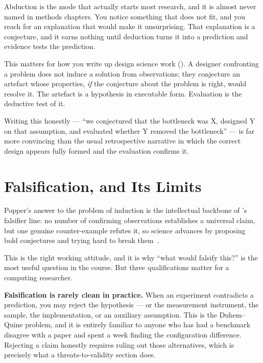 Abduction is the mode that actually starts most research, and it is almost
never named in methods chapters. You notice something that does not fit, and
you reach for an explanation that would make it unsurprising. That explanation
is a conjecture, and it earns nothing until deduction turns it into a
prediction and evidence tests the prediction.

\begin{conceptbox}
This matters for how you write up design science work ().
A designer confronting a problem does not induce a solution from observations;
they conjecture an artefact whose properties, \emph{if} the conjecture about
the problem is right, would resolve it. The artefact is a hypothesis in
executable form. Evaluation is the deductive test of it.

\medskip
Writing this honestly --- ``we conjectured that the bottleneck was X, designed
Y on that assumption, and evaluated whether Y removed the bottleneck'' --- is
far more convincing than the usual retrospective narrative in which the correct
design appears fully formed and the evaluation confirms it.
\end{conceptbox}

\section{Falsification, and Its Limits}

Popper's answer to the problem of induction is the intellectual backbone of
's falsifier line: no number of confirming observations
establishes a universal claim, but one genuine counter-example refutes it, so
science advances by proposing bold conjectures and trying hard to break
them~\cite{popper2002logic}.

This is the right working attitude, and it is why ``what would falsify this?''
is the most useful question in the course. But three qualifications matter for
a computing researcher.

\textbf{Falsification is rarely clean in practice.} When an experiment
contradicts a prediction, you may reject the hypothesis --- or the measurement
instrument, the sample, the implementation, or an auxiliary assumption. This is
the Duhem--Quine problem, and it is entirely familiar to anyone who has had a
benchmark disagree with a paper and spent a week finding the configuration
difference. Rejecting a claim honestly requires ruling out those alternatives,
which is precisely what a threats-to-validity section does.

